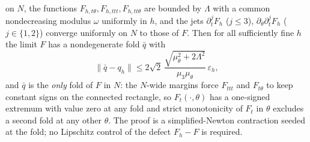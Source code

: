 \documentclass[aps,pre,reprint,amsmath,amssymb,longbibliography,floatfix]{revtex4-2}
\begin{document}
on \(N\), the functions
\(F_{h,t\theta},F_{h,ttt},F_{h,tt\theta}\) are bounded by \(\Lambda\) with
a common nondecreasing modulus \(\omega\) uniformly in \(h\), and the jets
\(\partial_t^jF_h\) (\(j\le3\)), \(\partial_\theta\partial_t^jF_h\)
(\(j\in\{1,2\}\)) converge uniformly on \(N\) to those of \(F\). Then for all
sufficiently fine \(h\) the limit \(F\) has a nondegenerate fold \(\bar q\)
with
\[
\|\bar q-q_h\|\le
2\sqrt2\,\frac{\sqrt{\mu_\theta^2+2\Lambda^2}}{\mu_3\mu_\theta}\,
\varepsilon_h ,
\]
and \(\bar q\) is the \emph{only} fold of \(F\) in \(N\): the \(N\)-wide
margins force \(F_{ttt}\) and \(F_{t\theta}\) to keep constant signs on the
connected rectangle, so \(F_t(\cdot,\theta)\) has a one-signed extremum
with value zero at any fold and strict monotonicity of \(F_t\) in
\(\theta\) excludes a second fold at any other \(\theta\). The proof \cite{supplementalMaterial} is a simplified-Newton contraction
seeded at the fold; no
Lipschitz control of the defect \(F_h-F\) is required.
\end{document}
